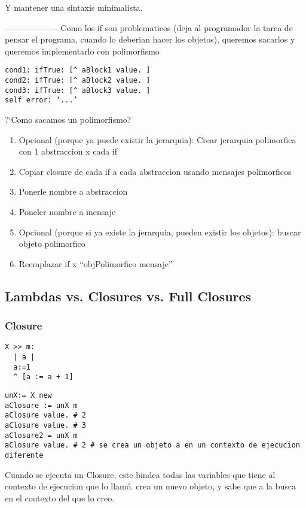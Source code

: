 Y mantener una sintaxis minimalista. 

------------------- 
Como los if son problematicos (deja al programador la tarea de pensar el programa, cuando lo deberian hacer los objetos), queremos sacarlos y queremos implementarlo con polimorfismo

\begin{verbatim}
cond1: ifTrue: [^ aBlock1 value. ]
cond2: ifTrue: [^ aBlock2 value. ]
cond3: ifTrue: [^ aBlock3 value. ]
self error: ‘...’
\end{verbatim}

?`Como sacamos un polimorfismo? 
\begin{enumerate}
\item Opcional (porque ya puede existir la jerarquia): Crear jerarquia polimorfica con 1 abstraccion x cada if
\item Copiar closure de cada if a cada abstraccion usando mensajes polimorficos
\item Ponerle nombre a abstraccion
\item Poneler nombre a mensaje
\item Opcional (porque si ya existe la jerarquia, pueden existir los objetos): buscar objeto polimorfico
\item Reemplazar if x “objPolimorfico mensaje”
\end{enumerate}

\subsection{Lambdas vs. Closures vs. Full Closures}

\subsubsection{Closure}

\begin{verbatim}
X >> m:
  | a |
  a:=1 
  ^ [a := a + 1]
\end{verbatim}

\begin{verbatim}
unX:= X new
aClosure := unX m
aClosure value. # 2
aClosure value. # 3
aClosure2 = unX m
aClosure value. # 2 # se crea un objeto a en un contexto de ejecucion diferente
\end{verbatim}

Cuando se ejecuta un Closure, este bindea todas las variables que tiene al contexto de ejecucion que lo llamó. \code{[ .. ]} crea un nuevo objeto, y sabe que a  la busca en el contexto del que lo creo. 

